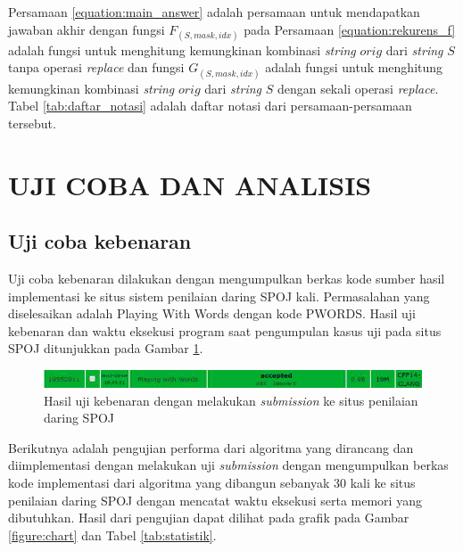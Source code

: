 \documentclass[a4paper]{IEEEtran}
\begin{document}
Persamaan \ref{equation:main_answer} adalah persamaan untuk mendapatkan jawaban akhir dengan fungsi $ F_{(S, mask, idx)} $ pada Persamaan \ref{equation:rekurens_f} adalah fungsi untuk menghitung kemungkinan kombinasi \textit{string} $ orig $ dari \textit{string} $ S $ tanpa operasi \textit{replace} dan fungsi $ G_{(S, mask, idx)} $ adalah fungsi untuk menghitung kemungkinan kombinasi \textit{string} $ orig $ dari \textit{string} $ S $ dengan sekali operasi \textit{replace}. Tabel \ref{tab:daftar_notasi} adalah daftar notasi dari persamaan-persamaan tersebut.

\section{UJI COBA DAN ANALISIS}



\subsection{Uji coba kebenaran}
Uji coba kebenaran dilakukan dengan mengumpulkan berkas kode sumber hasil implementasi ke situs sistem penilaian daring SPOJ kali. Permasalahan yang diselesaikan adalah Playing With Words dengan kode PWORDS. Hasil uji kebenaran dan waktu eksekusi program saat pengumpulan kasus uji pada situs SPOJ ditunjukkan pada Gambar \ref{figure:uji_kebenaran_spoj}.

\begin{figure}[h]
	\centering
	\includegraphics[width=\linewidth]{images/single-submission.jpg}
	\caption{Hasil uji kebenaran dengan melakukan \textit{submission} ke situs penilaian daring SPOJ}
	\label{figure:uji_kebenaran_spoj}
\end{figure}

Berikutnya adalah pengujian performa dari algoritma yang dirancang dan diimplementasi dengan melakukan uji \textit{submission} dengan mengumpulkan berkas kode implementasi dari algoritma yang dibangun sebanyak 30 kali ke situs penilaian daring SPOJ dengan mencatat waktu eksekusi serta memori yang dibutuhkan. Hasil dari pengujian dapat dilihat pada grafik pada Gambar \ref{figure:chart} dan Tabel \ref{tab:statistik}.
\end{document}
